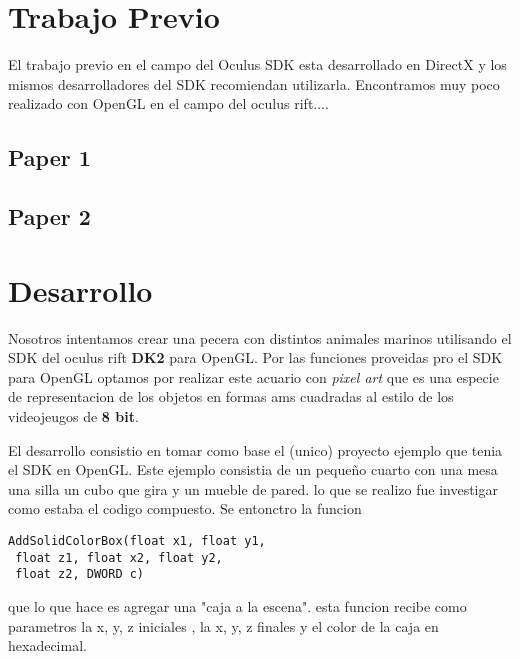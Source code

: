 \documentclass[10pt, a4paper, twocolumn]{article}
\begin{document}
\section{Trabajo Previo}

El trabajo previo en el campo del Oculus SDK esta desarrollado en DirectX y los mismos desarrolladores del SDK recomiendan utilizarla. Encontramos muy poco realizado con OpenGL en el campo del oculus rift....


\subsection{Paper 1}




\subsection{Paper 2}


\section{Desarrollo}
Nosotros intentamos crear una pecera  con distintos animales marinos utilisando el SDK del oculus rift  \textbf{DK2} para OpenGL. Por las funciones proveidas pro el SDK para OpenGL optamos por realizar este acuario con \textit{pixel art} que es una especie de representacion de los objetos en formas ams cuadradas al estilo de los videojeugos de \textbf{8 bit}.

El desarrollo consistio en tomar como base el (unico) proyecto ejemplo que tenia el SDK en OpenGL. Este ejemplo consistia de un pequeño cuarto con una mesa una silla un cubo que gira y un mueble de pared. lo que se realizo fue investigar como estaba el codigo compuesto. Se entonctro la funcion
\begin{lstlisting}
AddSolidColorBox(float x1, float y1,
 float z1, float x2, float y2, 
 float z2, DWORD c)
\end{lstlisting}
que lo que hace es agregar una "caja a la escena". esta funcion recibe como parametros la x, y, z iniciales , la x, y, z finales y el color de la caja en hexadecimal.
\end{document}
